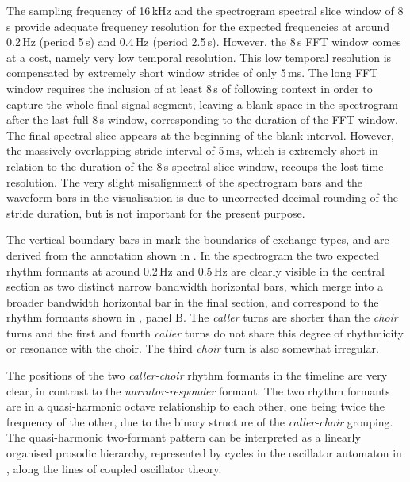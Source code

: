 \documentclass[output=paper,colorlinks,citecolor=brown]{langscibook}
\begin{document}
The sampling frequency of 16\,kHz and the spectrogram spectral slice window of 8\,s provide adequate frequency resolution for the expected frequencies at around 0.2\,Hz (period 5\,s) and 0.4\,Hz (period 2.5\,s). However, the 8\,s FFT window comes at a cost, namely very low temporal resolution. This low temporal resolution is compensated by extremely short window strides of only 5\,ms. The long FFT window requires the inclusion of at least 8\,s of following context in order to capture the whole final signal segment, leaving a blank space in the spectrogram after the last full 8\,s window, corresponding to the duration of the FFT window. The final spectral slice appears at the beginning of the blank interval. However, the massively overlapping stride interval of 5\,ms, which is extremely short in relation to the duration of the 8\,s spectral slice window, recoups the lost time resolution. The very slight misalignment of the spectrogram bars and the waveform bars in the visualisation is due to uncorrected decimal rounding of the stride duration, but is not important for the present purpose.

The vertical boundary bars in  mark the boundaries of exchange types, and are derived from the annotation shown in . In the spectrogram the two expected rhythm formants at around 0.2\,Hz and 0.5\,Hz are clearly visible in the central section as two distinct narrow bandwidth horizontal bars, which merge into a broader bandwidth horizontal bar in the final section, and correspond to the rhythm formants shown in , panel B. The \textit{caller} turns are shorter than the \textit{choir} turns and the first and fourth \textit{caller} turns do not share this degree of rhythmicity or resonance with the choir. The third \textit{choir} turn is also somewhat irregular.

The positions of the two \textit{caller-choir} rhythm formants in the timeline are very clear, in contrast to the \textit{narrator-responder} formant. The two rhythm formants are in a quasi-harmonic octave relationship to each other, one being twice the frequency of the other, due to the binary structure of the \textit{caller-choir} grouping. The quasi-harmonic two-formant pattern can be interpreted as a linearly organised prosodic hierarchy, represented by cycles in the oscillator automaton in , along the lines of coupled oscillator theory.
\end{document}
